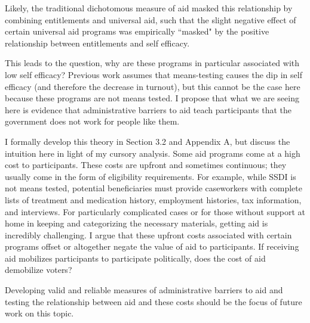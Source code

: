 \documentclass[12pt]{paper}
\begin{document}
Likely, the traditional dichotomous measure of aid masked this relationship by combining entitlements and universal aid, such that the slight negative effect of certain universal aid programs was empirically ``masked" by the positive relationship between entitlements and self efficacy.

This leads to the question, why are these programs in particular associated with low self efficacy? Previous work assumes that means-testing causes the dip in self efficacy (and therefore the decrease in turnout), but this cannot be the case here because these programs are not means tested. I propose that what we are seeing here is evidence that administrative barriers to aid teach participants that the government does not work for people like them.

I formally develop this theory in Section 3.2 and Appendix A, but discuss the intuition here in light of my cursory analysis. Some aid programs come at a high cost to participants. These costs are upfront and sometimes continuous; they usually come in the form of eligibility requirements. For example, while SSDI is not means tested, potential beneficiaries must provide caseworkers with complete lists of treatment and medication history, employment histories, tax information, and interviews. For particularly complicated cases or for those without support at home in keeping and categorizing the necessary materials, getting aid is incredibly challenging. I argue that these upfront costs associated with certain programs offset or altogether negate the value of aid to participants. If receiving aid mobilizes participants to participate politically, does the cost of aid demobilize voters?

Developing valid and reliable measures of administrative barriers to aid and testing the relationship between aid and these costs should be the focus of future work on this topic.
\end{document}

